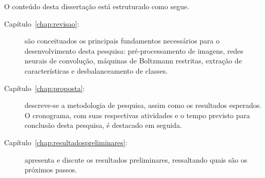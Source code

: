 O conteúdo desta dissertação está estruturado como segue.

\begin{description}
\item [Capítulo~\ref{chap:revisao}:] são conceituados os principais fundamentos necessários para o desenvolvimento desta pesquisa: pré-processamento de imagens, redes neurais de convolução, máquinas de Boltzmann restritas, extração de características e desbalanceamento de classes.

\item [Capítulo~\ref{chap:proposta}:] descreve-se a metodologia de pesquisa, assim como os resultados esperados. O cronograma, com suas respectivas atividades e o tempo previsto para conclusão desta pesquisa, é destacado em seguida.

\item [Capítulo~\ref{chap:resultadospreliminares}:] apresenta e discute os resultados preliminares, ressaltando quais são os próximos passos.
\end{description}
